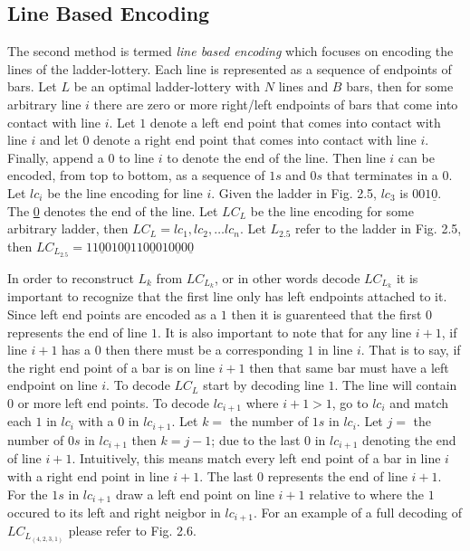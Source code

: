 \subsection{Line Based Encoding}
The second method is termed \emph{line based encoding} which focuses 
on encoding the lines of the ladder-lottery. Each line is represented 
as a sequence of endpoints of bars. Let $L$ be an optimal ladder-lottery 
with $N$ lines and $B$ bars, then for some arbitrary line $i$ there 
are zero or more right/left endpoints of bars that 
come into contact with line $i$. Let $1$ denote a left end point that 
comes into contact with line $i$ and let $0$ denote a right 
end point that comes into contact with line $i$. Finally, append a $0$
to line $i$ to denote the end of the line. Then line $i$ can be 
encoded, from top to bottom, as a sequence of $1s$ and $0s$ that 
terminates in a $0$. Let $lc_{i}$ be 
the line encoding for line $i$. Given the ladder in Fig. 2.5, 
$lc_{3}$ is $001\underline{0}$. The \underline{0} denotes 
the end of the line. Let $LC_{L}$ be the line encoding for 
some arbitrary ladder, then $LC_{L}=lc_{1}, lc_{2}, \dots lc_{n}$.
Let $L_{2.5}$ refer to the ladder in Fig. 2.5, then 
$LC_{L_{2.5}}=11\underline{0}010\underline{0}110\underline{0}010\underline{0}0\underline{0}$\par 
In order to reconstruct $L_{k}$ from $LC_{L_{k}}$, or in other words decode
$LC_{L_{k}}$ it is important to recognize that the first line only has left endpoints attached to it. Since left 
end points are encoded as a $1$ then it is guarenteed that the first $0$ 
represents the end of line $1$. It is also important to note that for any 
line $i+1$, if line $i+1$ has a $0$ then there must be a corresponding $1$
in line $i$. That is to say, if the right end point of a bar is on line 
$i+1$ then that same bar must have a left endpoint on line $i$. To decode 
$LC_{L}$ start by decoding line $1$. The line will contain $0$ or more 
left end points. To decode $lc_{i+1}$ where $i+1>1$, go to 
$lc_{i}$ and match each $1$ in $lc_{i}$ with a $0$ in $lc_{i+1}$. 
Let $k=$ the number of $1s$ in $lc_{i}$. Let $j=$ the number 
of $0s$ in $lc_{i+1}$ then $k=j-1$; due to the last $0$ in $lc_{i+1}$ denoting 
the end of line $i+1$.  Intuitively, this means match every left end point 
of a bar in line $i$ with a right end point in line $i+1$. The last $0$
represents the end of line $i+1$. For the $1s$ in $lc_{i+1}$ draw a left 
end point on line $i+1$ relative to where the $1$ occured to its left and 
right neigbor in $lc_{i+1}$. For an example of a full decoding of $LC_{L_{(4,2,3,1)}}$
please refer to Fig. 2.6.

